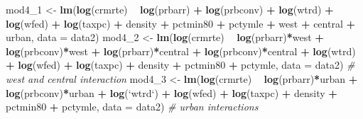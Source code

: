 \documentclass[]{article}
\newenvironment{Shaded}{\begin{snugshade}}{\end{snugshade}}
\newcommand{\CommentTok}[1]{\textcolor[rgb]{0.56,0.35,0.01}{\textit{#1}}}
\newcommand{\DataTypeTok}[1]{\textcolor[rgb]{0.13,0.29,0.53}{#1}}
\newcommand{\DecValTok}[1]{\textcolor[rgb]{0.00,0.00,0.81}{#1}}
\newcommand{\KeywordTok}[1]{\textcolor[rgb]{0.13,0.29,0.53}{\textbf{#1}}}
\newcommand{\NormalTok}[1]{#1}
\newcommand{\OperatorTok}[1]{\textcolor[rgb]{0.81,0.36,0.00}{\textbf{#1}}}
\newcommand{\StringTok}[1]{\textcolor[rgb]{0.31,0.60,0.02}{#1}}
\begin{document}
\begin{Shaded}
\begin{Highlighting}[]
\NormalTok{mod4_}\DecValTok{1}\NormalTok{ <-}\StringTok{ }\KeywordTok{lm}\NormalTok{(}\KeywordTok{log}\NormalTok{(crmrte) }\OperatorTok{~}\StringTok{ }\KeywordTok{log}\NormalTok{(prbarr) }\OperatorTok{+}\StringTok{ }\KeywordTok{log}\NormalTok{(prbconv) }\OperatorTok{+}\StringTok{ }\KeywordTok{log}\NormalTok{(wtrd)  }\OperatorTok{+}\StringTok{ }\KeywordTok{log}\NormalTok{(wfed) }\OperatorTok{+}\StringTok{ }\KeywordTok{log}\NormalTok{(taxpc) }\OperatorTok{+}\StringTok{ }\NormalTok{density }\OperatorTok{+}\StringTok{ }\NormalTok{pctmin80 }\OperatorTok{+}\StringTok{ }\NormalTok{pctymle }\OperatorTok{+}\StringTok{ }\NormalTok{west }\OperatorTok{+}\StringTok{ }\NormalTok{central }\OperatorTok{+}\StringTok{ }\NormalTok{urban, }\DataTypeTok{data =}\NormalTok{ data2)}
\NormalTok{mod4_}\DecValTok{2}\NormalTok{ <-}\StringTok{ }\KeywordTok{lm}\NormalTok{(}\KeywordTok{log}\NormalTok{(crmrte) }\OperatorTok{~}\StringTok{ }\KeywordTok{log}\NormalTok{(prbarr)}\OperatorTok{*}\NormalTok{west }\OperatorTok{+}\StringTok{ }\KeywordTok{log}\NormalTok{(prbconv)}\OperatorTok{*}\NormalTok{west }\OperatorTok{+}\StringTok{ }\KeywordTok{log}\NormalTok{(prbarr)}\OperatorTok{*}\NormalTok{central }\OperatorTok{+}\StringTok{ }\KeywordTok{log}\NormalTok{(prbconv)}\OperatorTok{*}\NormalTok{central }\OperatorTok{+}\StringTok{ }\KeywordTok{log}\NormalTok{(wtrd) }\OperatorTok{+}\StringTok{ }\KeywordTok{log}\NormalTok{(wfed) }\OperatorTok{+}\StringTok{ }\KeywordTok{log}\NormalTok{(taxpc) }\OperatorTok{+}\StringTok{ }\NormalTok{density }\OperatorTok{+}\StringTok{ }\NormalTok{pctmin80 }\OperatorTok{+}\StringTok{ }\NormalTok{pctymle, }\DataTypeTok{data =}\NormalTok{ data2)   }\CommentTok{# west and central interaction}
\NormalTok{mod4_}\DecValTok{3}\NormalTok{ <-}\StringTok{ }\KeywordTok{lm}\NormalTok{(}\KeywordTok{log}\NormalTok{(crmrte) }\OperatorTok{~}\StringTok{ }\KeywordTok{log}\NormalTok{(prbarr)}\OperatorTok{*}\NormalTok{urban }\OperatorTok{+}\StringTok{ }\KeywordTok{log}\NormalTok{(prbconv)}\OperatorTok{*}\NormalTok{urban }\OperatorTok{+}\StringTok{ }\KeywordTok{log}\NormalTok{(}\StringTok{`}\DataTypeTok{wtrd}\StringTok{`}\NormalTok{) }\OperatorTok{+}\StringTok{ }\KeywordTok{log}\NormalTok{(wfed) }\OperatorTok{+}\StringTok{ }\KeywordTok{log}\NormalTok{(taxpc) }\OperatorTok{+}\StringTok{ }\NormalTok{density }\OperatorTok{+}\StringTok{ }\NormalTok{pctmin80 }\OperatorTok{+}\StringTok{ }\NormalTok{pctymle, }\DataTypeTok{data =}\NormalTok{ data2)  }\CommentTok{# urban interactions}

\end{Highlighting}
\end{Shaded}
\end{document}
